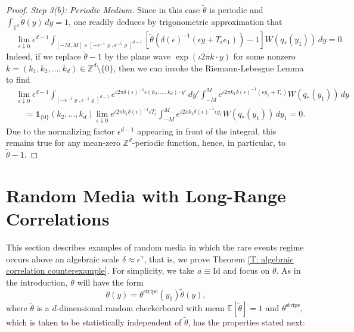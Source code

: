 \documentclass[12pt]{amsart}
\begin{document}
\begin{proof}
	\textit{Step 3(b): Periodic Medium.} Since in this case $\tilde{\theta}$ is periodic and $\int_{\mathbb{T}^{d}} \tilde{\theta}(y) \, dy = 1$, one readily deduces by trigonometric approximation that
	\begin{align*}
		&\lim_{\epsilon \downarrow 0} \epsilon^{d-1} \int_{[-M,M] \times [-\epsilon^{-1}\varrho,\epsilon^{-1}\varrho]^{d-1}} \left[ \tilde{\theta}(\delta(\epsilon)^{-1}(\epsilon y + T_{\epsilon} e_{1} )) - 1 \right] W(q_{*}(y_{1})) \, dy = 0.
	\end{align*}
Indeed, if we replace $\tilde{\theta} - 1$ by the plane wave $\exp ( \iota 2 \pi k \cdot y )$ for some nonzero $k = (k_{1},k_{2},\dots,k_{d}) \in \mathbb{Z}^{d} \setminus \{0\}$, then we can invoke the Riemann-Lebesgue Lemma to find
	\begin{align*}
		&\lim_{\epsilon \downarrow 0} \epsilon^{d-1} \int_{[-\epsilon^{-1}\varrho,\epsilon^{-1}\varrho]^{d-1}} e^{\iota 2 \pi \delta(\epsilon)^{-1} \epsilon (k_{2},\dots,k_{d}) \cdot y'} \, dy'  \int_{-M}^{M} e^{ \iota 2 \pi k_{1} \delta(\epsilon)^{-1} ( \epsilon y_{1} + T_{\epsilon} ) } W(q_{*}(y_{1})) \, dy \\
		&\quad = \mathbf{1}_{\{0\}} (k_{2},\dots,k_{d})  \lim_{ \epsilon \downarrow 0 } e^{ \iota 2 \pi k_{1} \delta(\epsilon)^{-1} \epsilon T_{\epsilon} } \int_{-M}^{M} e^{ \iota 2 \pi k_{1} \delta(\epsilon)^{-1} \epsilon y_{1}  } W(q_{*}(y_{1})) \, dy_{1} = 0.
	\end{align*}
Due to the normalizing factor $\epsilon^{d-1}$ appearing in front of the integral, this remains true for any mean-zero $\mathbb{Z}^{d}$-periodic function, hence, in particular, to $\tilde{\theta} - 1$.\end{proof}
	
\section{Random Media with Long-Range Correlations} \label{S: long range correlations}

This section describes examples of random media in which the rare events regime occurs above an algebraic scale $\delta \approx \epsilon^{\gamma}$, that is, we prove Theorem \ref{T: algebraic correlation counterexample}.  For simplicity, we take $a \equiv \text{Id}$ and focus on $\theta$.  As in the introduction, $\theta$ will have the form
	\begin{equation*}
		\theta(y) = \theta^{\text{stripe}}(y_{1}) \tilde{\theta}(y),
	\end{equation*}
where $\tilde{\theta}$ is a $d$-dimensional random checkerboard with mean $\mathbb{E}[\tilde{\theta}] = 1$ and $\theta^{\text{stripe}}$, which is taken to be statistically independent of $\tilde{\theta}$, has the properties stated next:
\end{document}
